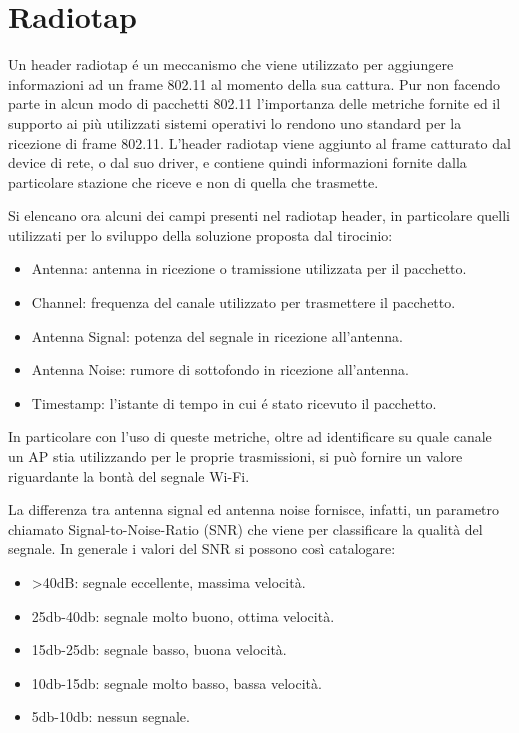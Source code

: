 \section{Radiotap}

Un header radiotap \'e un meccanismo che viene utilizzato per aggiungere informazioni ad un frame 802.11 al momento della sua cattura.
Pur non facendo parte in alcun modo di pacchetti 802.11 l'importanza delle metriche fornite ed il supporto ai pi\`u utilizzati sistemi operativi lo rendono 
uno standard per la ricezione di frame 802.11.
L'header radiotap viene aggiunto al frame catturato dal device di rete, o dal suo driver, e contiene quindi informazioni fornite dalla particolare stazione che riceve e non di quella che trasmette.

Si elencano ora alcuni dei campi presenti nel radiotap header, in particolare quelli utilizzati per lo sviluppo della soluzione proposta dal tirocinio:

\begin{itemize}
	\item Antenna: antenna in ricezione o tramissione utilizzata per il pacchetto.
	\item Channel: frequenza del canale utilizzato per trasmettere il pacchetto.
	\item Antenna Signal: potenza del segnale in ricezione all'antenna.
	\item Antenna Noise: rumore di sottofondo in ricezione all'antenna.
	\item Timestamp: l'istante di tempo in cui \'e stato ricevuto il pacchetto.
\end{itemize}

In particolare con l'uso di queste metriche, oltre ad identificare su quale canale un AP stia utilizzando per le proprie trasmissioni, si pu\`o fornire un valore riguardante la bont\`a del segnale Wi-Fi.

La differenza tra antenna signal ed antenna noise fornisce, infatti, un parametro chiamato Signal-to-Noise-Ratio (SNR) che viene per classificare la qualit\`a del segnale.
In generale i valori del SNR si possono cos\`i catalogare:

\begin{itemize}
	\item >40dB: segnale eccellente, massima velocit\`a.
	\item 25db-40db: segnale molto buono, ottima velocit\`a.
	\item 15db-25db: segnale basso, buona velocit\`a.
	\item 10db-15db: segnale molto basso, bassa velocit\`a.
	\item 5db-10db: nessun segnale.
\end{itemize}

